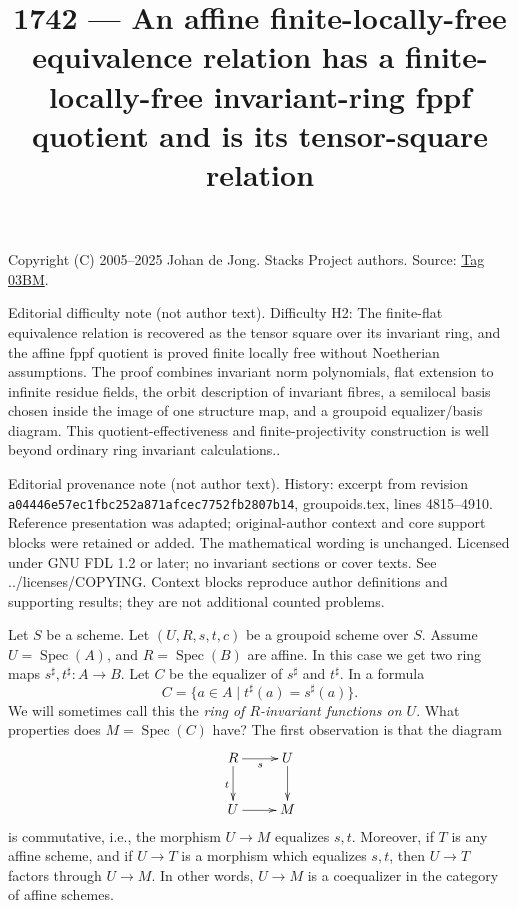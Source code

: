 \documentclass{amsart}
\theoremstyle{plain}
\theoremstyle{definition}
\theoremstyle{remark}
\numberwithin{equation}{subsection}
\def\Spec{\mathop{\mathrm{Spec}}}
\begin{document}
\title[Stacks Project, Tag 03BM]{1742 --- An affine finite-locally-free equivalence relation has a finite-locally-free invariant-ring fppf quotient and is its tensor-square relation}
\maketitle
\noindent Copyright (C) 2005--2025 Johan de Jong. Stacks Project authors. Source: \href{https://stacks.math.columbia.edu/tag/03BM}{Tag 03BM}.

\noindent Editorial difficulty note (not author text). Difficulty H2: The finite-flat equivalence relation is recovered as the tensor square over its invariant ring, and the affine fppf quotient is proved finite locally free without Noetherian assumptions. The proof combines invariant norm polynomials, flat extension to infinite residue fields, the orbit description of invariant fibres, a semilocal basis chosen inside the image of one structure map, and a groupoid equalizer/basis diagram. This quotient-effectiveness and finite-projectivity construction is well beyond ordinary ring invariant calculations..

\noindent Editorial provenance note (not author text). History: excerpt from revision \texttt{a0444\allowbreak 6e57e\allowbreak c1fbc\allowbreak 252a8\allowbreak 71afc\allowbreak ec775\allowbreak 2fb28\allowbreak 07b14}, groupoids.tex, lines 4815--4910. Reference presentation was adapted; original-author context and core support blocks were retained or added. The mathematical wording is unchanged. Licensed under GNU FDL 1.2 or later; no invariant sections or cover texts. See ../licenses/COPYING. Context blocks reproduce author definitions and supporting results; they are not additional counted problems.

\noindent
Let $S$ be a scheme.
Let $(U, R, s, t, c)$ be a groupoid scheme over $S$.
Assume $U = \Spec(A)$, and $R = \Spec(B)$ are affine.
In this case we get two ring maps
$s^\sharp, t^\sharp : A \longrightarrow B$.
Let $C$ be the equalizer of $s^\sharp$ and $t^\sharp$. In a formula
\begin{equation}
\label{equation-invariants}
C = \{a \in A \mid t^\sharp(a) = s^\sharp(a) \}.
\end{equation}
We will sometimes call this the {\it ring of $R$-invariant functions on $U$}.
What properties does $M = \Spec(C)$ have? The first observation is
that the diagram
$$
\xymatrix{
R \ar[r]_s \ar[d]_t & U \ar[d] \\
U \ar[r] & M
}
$$
is commutative, i.e., the morphism $U \to M$ equalizes $s, t$.
Moreover, if $T$ is any affine scheme, and if $U \to T$ is
a morphism which equalizes $s, t$, then $U \to T$ factors through $U \to M$.
In other words, $U \to M$ is a coequalizer in the category of affine schemes.
\end{document}
